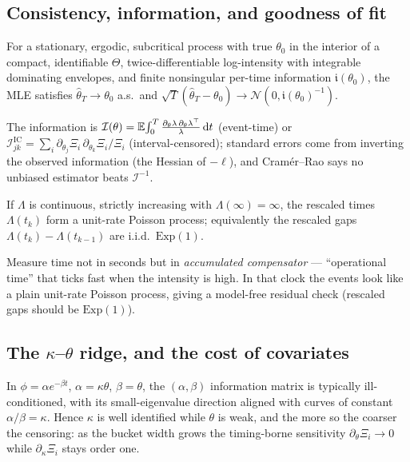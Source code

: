 \subsection{Consistency, information, and goodness of fit}

\begin{theorem}
For a stationary, ergodic, subcritical process with true $\theta_0$ in the interior
of a compact, identifiable $\Theta$, twice-differentiable log-intensity with
integrable dominating envelopes, and finite nonsingular per-time information
$\mathfrak i(\theta_0)$, the MLE satisfies $\hat\theta_T\to\theta_0$ a.s.\ and
$\sqrt T(\hat\theta_T-\theta_0)\to\mathcal N(0,\mathfrak i(\theta_0)^{-1})$.
\end{theorem}
The information is
$\mathcal I(\theta)=\mathbb{E}\!\int_0^T\frac{\partial_\theta\lambda\,\partial_\theta\lambda^\top}{\lambda}\,\mathrm{d} t$
(event-time) or
$\mathcal I^{\mathrm{IC}}_{jk}=\sum_i\partial_{\theta_j}\Xi_i\,\partial_{\theta_k}\Xi_i/\Xi_i$
(interval-censored); standard errors come from inverting the observed information
(the Hessian of $-\ell$), and Cram\'er--Rao says no unbiased estimator beats
$\mathcal I^{-1}$.

\begin{theorem}
If $\Lambda$ is continuous, strictly increasing with $\Lambda(\infty)=\infty$, the
rescaled times $\Lambda(t_k)$ form a unit-rate Poisson process; equivalently the
rescaled gaps $\Lambda(t_k)-\Lambda(t_{k-1})$ are i.i.d.\ $\mathrm{Exp}(1)$.
\end{theorem}

\begin{intuition}
Measure time not in seconds but in \emph{accumulated compensator} --- ``operational
time'' that ticks fast when the intensity is high. In that clock the events look
like a plain unit-rate Poisson process, giving a model-free residual check
(rescaled gaps should be $\mathrm{Exp}(1)$).
\end{intuition}

\subsection{The $\kappa$--$\theta$ ridge, and the cost of covariates}

\begin{proposition}
In $\phi=\alpha e^{-\beta t}$, $\alpha=\kappa\theta$, $\beta=\theta$, the
$(\alpha,\beta)$ information matrix is typically ill-conditioned, with its
small-eigenvalue direction aligned with curves of constant $\alpha/\beta=\kappa$.
Hence $\kappa$ is well identified while $\theta$ is weak, and the more so the
coarser the censoring: as the bucket width grows the timing-borne sensitivity
$\partial_\theta\Xi_i\to0$ while $\partial_\kappa\Xi_i$ stays order one.
\end{proposition}

